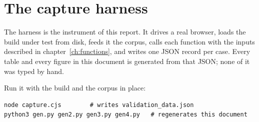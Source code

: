 \appendix
\chapter{The capture harness}\label{app:harness}

The harness is the instrument of this report. It drives a real browser, loads the build under test
from disk, feeds it the corpus, calls each function with the inputs described in
chapter~\ref{ch:functions}, and writes one JSON record per case. Every table and every figure in
this document is generated from that JSON; none of it was typed by hand.

Run it with the build and the corpus in place:

\begin{lstlisting}[style=plain]
node capture.cjs        # writes validation_data.json
python3 gen.py gen2.py gen3.py gen4.py   # regenerates this document
\end{lstlisting}

